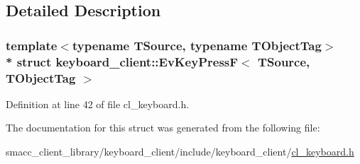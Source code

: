 \subsection{Detailed Description}
\subsubsection*{template$<$typename T\+Source, typename T\+Object\+Tag$>$\\*
struct keyboard\+\_\+client\+::\+Ev\+Key\+Press\+F$<$ T\+Source, T\+Object\+Tag $>$}



Definition at line 42 of file cl\+\_\+keyboard.\+h.



The documentation for this struct was generated from the following file\+:\begin{DoxyCompactItemize}
\item 
smacc\+\_\+client\+\_\+library/keyboard\+\_\+client/include/keyboard\+\_\+client/\hyperlink{cl__keyboard_8h}{cl\+\_\+keyboard.\+h}\end{DoxyCompactItemize}
